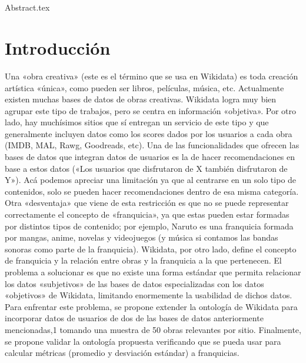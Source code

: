 \documentclass{article}
\begin{document}
  \begin{titlepage}
    \centering
    \vspace*{2cm}
    \titleblock [2cm]
    \vspace{1cm}  %
    \authorblock
    \vfill  %
    \location \\
    \dateblock \\
    \footnotesize { \texttt{\fullversion} }
  \end{titlepage}
  \attributionpage

  {Abstract.tex}
  \newpage
  \tableofcontents

  \newpage
  \clearpage
  
  \section{Introducción}
  Una «obra creativa» (este es el término que se usa en Wikidata) es toda creación artística «única», como pueden ser
libros, películas, música, etc. Actualmente existen muchas bases de datos de obras creativas. Wikidata logra muy
bien agrupar este tipo de trabajos, pero se centra en información «objetiva». Por otro lado, hay muchísimos sitios
que sí entregan un servicio de este tipo y que generalmente incluyen datos como los scores dados por los usuarios a
cada obra (IMDB, MAL, Rawg, Goodreads, etc).
Una de las funcionalidades que ofrecen las bases de datos que integran datos de usuarios es la de hacer recomendaciones en base a estos datos («Los usuarios que disfrutaron de X también disfrutaron de Y»). Acá podemos apreciar
una limitación ya que al centrarse en un solo tipo de contenidos, solo se pueden hacer recomendaciones dentro de esa
misma categoría. Otra «desventaja» que viene de esta restricción es que no se puede representar correctamente el
concepto de «franquicia», ya que estas pueden estar formadas por distintos tipos de contenido; por ejemplo, Naruto
es una franquicia formada por mangas, anime, novelas y videojuegos (y música si contamos las bandas sonoras
como parte de la franquicia). Wikidata, por otro lado, define el concepto de franquicia y la relación entre obras y
la franquicia a la que pertenecen.
El problema a solucionar es que no existe una forma estándar que permita relacionar los datos «subjetivos» de las
bases de datos especializadas con los datos «objetivos» de Wikidata, limitando enormemente la usabilidad de dichos
datos.
Para enfrentar este problema, se propone extender la ontología de Wikidata para incorporar datos de usuarios
de dos de las bases de datos anteriormente mencionadas,1
tomando una muestra de 50 obras relevantes por sitio.
Finalmente, se propone validar la ontología propuesta verificando que se pueda usar para calcular métricas (promedio
y desviación estándar) a franquicias.
\end{document}
